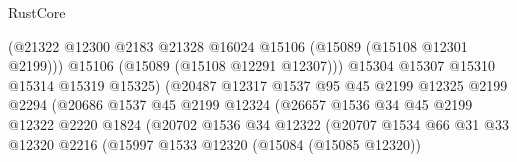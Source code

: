 \begin{lexlean}{RustCore}
\begin{coremodule}
                                          (@21322
                                            @12300
                                            @2183
                                            @21328
                                            @16024
                                            @15106
                                            (@15089 (@15108 @12301 @2199)))
                                          @15106
                                          (@15089 (@15108 @12291 @12307)))
                                        @15304
                                        @15307
                                        @15310
                                        @15314
                                        @15319
                                        @15325)
                                      (@20487
                                        @12317
                                        @1537
                                        @95
                                        @45
                                        @2199
                                        @12325
                                        @2199
                                        @2294
                                        (@20686
                                          @1537
                                          @45
                                          @2199
                                          @12324
                                          (@26657
                                            @1536
                                            @34
                                            @45
                                            @2199
                                            @12322
                                            @2220
                                            @1824
                                            (@20702
                                              @1536
                                              @34
                                              @12322
                                              (@20707
                                                @1534
                                                @66
                                                @31
                                                @33
                                                @12320
                                                @2216
                                                (@15997
                                                  @1533
                                                  @12320
                                                  (@15084 (@15085 @12320))

\end{coremodule}
\end{lexlean}
